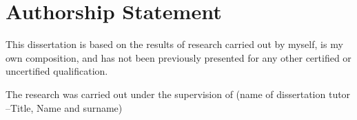 \newpage

\chapter*{\centering Authorship Statement}

\begin{spacing}{1.5}
\setlength{\parskip}{0.3in}


This dissertation is based on the results of research carried out by myself, is my
own composition, and has not been previously presented for any other certified
or uncertified qualification.

The research was carried out under the supervision of (name of dissertation tutor
–Title, Name and surname)

\vspace{2.5cm}

\begin{center}
	\makebox[4cm]{\dotfill}  \hfill \makebox[4cm]{\dotfill}\\
	      \hfill {}
\end{center}
\end{spacing}
\newpage
